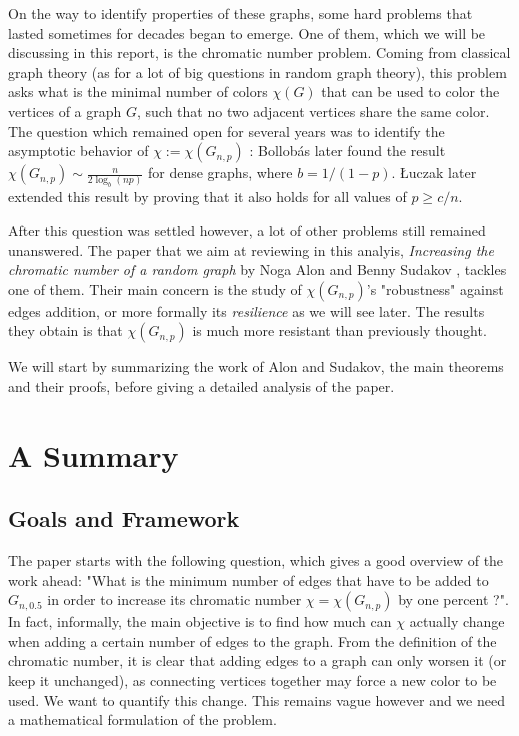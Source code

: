 \documentclass[10pt,journal,a4paper]{IEEEtran}
\theoremstyle{definition}   %
\begin{document}
On the way to identify properties of these graphs, some hard problems that lasted sometimes for decades began to emerge. One of them, which we will be discussing in this report, is the chromatic number problem. Coming from classical graph theory (as for a lot of big questions in random graph theory), this problem asks what is the minimal number of colors $\chi(G)$ that can be used to color the vertices of a graph $G$, such that no two adjacent vertices share the same color. The question which remained open for several years was to identify the asymptotic behavior of $\chi := \chi(G_{n, p})$ : Bollob\'as \cite{bollobas} later found the result $\chi(G_{n, p}) \sim \frac{n}{2 \log_b(np)}$ for dense graphs, where $b = 1 / (1-p)$. \L{}uczak \cite{luczak} later extended this result by proving that it also holds for all values of $p \ge c / n$.

After this question was settled however, a lot of other problems still remained unanswered. The paper that we aim at reviewing in this analyis, \textit{Increasing the chromatic number of a random graph} by Noga Alon and Benny Sudakov \cite{main_paper}, tackles one of them. Their main concern is the study of $\chi(G_{n, p})$'s "robustness" against edges addition, or more formally its \textit{resilience} as we will see later. The results they obtain is that $\chi(G_{n, p})$ is much more resistant than previously thought.

We will start by summarizing the work of Alon and Sudakov, the main theorems and their proofs, before giving a detailed analysis of the paper.

\section{A Summary}

\subsection{Goals and Framework}

The paper starts with the following question, which gives a good overview of the work ahead: "What is the minimum number of edges that have to be added to $G_{n, 0.5}$ in order to increase its chromatic number $\chi = \chi(G_{n, p})$ by one percent ?". In fact, informally, the main objective is to find how much can $\chi$ actually change when adding a certain number of edges to the graph. From the definition of the chromatic number, it is clear that adding edges to a graph can only worsen it (or keep it unchanged), as connecting vertices together may force a new color to be used. We want to quantify this change. This remains vague however and we need a mathematical formulation of the problem.
\end{document}
